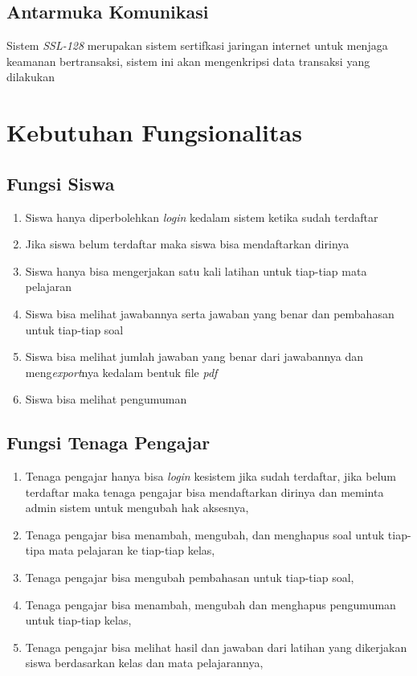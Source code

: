 \documentclass{scrreprt}
\begin{document}
	\subsection{Antarmuka Komunikasi}
	
	Sistem \emph{SSL-128} merupakan sistem sertifkasi jaringan internet untuk menjaga keamanan bertransaksi, sistem ini akan mengenkripsi data transaksi yang dilakukan
	
	



\section{Kebutuhan Fungsionalitas}

	\subsection{Fungsi Siswa}
	\begin{enumerate}
		\item Siswa hanya diperbolehkan \emph{login} kedalam sistem ketika sudah terdaftar
		\item Jika siswa belum terdaftar maka siswa bisa mendaftarkan dirinya
		\item Siswa hanya bisa mengerjakan satu kali latihan untuk tiap-tiap mata pelajaran
		\item Siswa bisa melihat jawabannya serta jawaban yang benar dan pembahasan untuk tiap-tiap soal
		\item Siswa bisa melihat jumlah jawaban yang benar dari jawabannya dan meng\emph{export}nya kedalam bentuk file \emph{pdf}
		\item Siswa bisa melihat pengumuman
	\end{enumerate}
	
	\subsection{Fungsi Tenaga Pengajar}
	
	\begin{enumerate}
		\item Tenaga pengajar hanya bisa \emph{login} kesistem jika sudah terdaftar, jika belum terdaftar maka tenaga pengajar bisa mendaftarkan dirinya dan meminta admin sistem untuk mengubah hak aksesnya,
		\item Tenaga pengajar bisa menambah, mengubah, dan menghapus soal untuk tiap-tipa mata pelajaran ke tiap-tiap kelas,
		\item Tenaga pengajar bisa mengubah pembahasan untuk tiap-tiap soal,
		\item Tenaga pengajar bisa menambah, mengubah dan menghapus pengumuman untuk tiap-tiap kelas,
		\item Tenaga pengajar bisa melihat hasil dan jawaban dari latihan yang dikerjakan siswa berdasarkan kelas dan mata pelajarannya,
	\end{enumerate}
	
\end{document}
